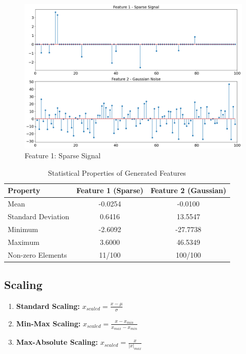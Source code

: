 \documentclass[12pt]{article}
\begin{document}
\begin{figure}[H]
    \centering
    \includegraphics[width=\textwidth]{resources/features.png}
    \caption{Feature 1: Sparse Signal}
    \label{fig:feature1_original}
\end{figure}

\begin{table}[H]
\centering
\caption{Statistical Properties of Generated Features}
\label{tab:feature_stats}
\begin{tabular}{@{}lcc@{}}
\toprule
Property & Feature 1 (Sparse) & Feature 2 (Gaussian) \\
\midrule
Mean & -0.0254 & -0.0100 \\
Standard Deviation & 0.6416 & 13.5547 \\
Minimum & -2.6092 & -27.7738 \\
Maximum & 3.6000 & 46.5349 \\
Non-zero Elements & 11/100 & 100/100 \\
\bottomrule
\end{tabular}
\end{table}

\newpage
\subsection{Scaling}

\begin{enumerate}
    \item \textbf{Standard Scaling:} $x_{scaled} = \frac{x - \mu}{\sigma}$
    \item \textbf{Min-Max Scaling:} $x_{scaled} = \frac{x - x_{min}}{x_{max} - x_{min}}$
    \item \textbf{Max-Absolute Scaling:} $x_{scaled} = \frac{x}{|x|_{max}}$
\end{enumerate}
\end{document}
